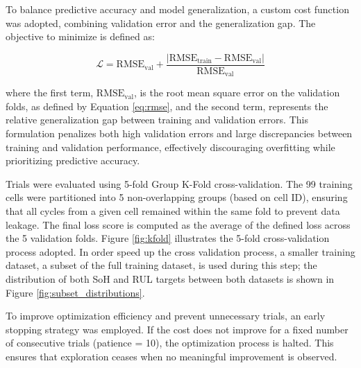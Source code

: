 To balance predictive accuracy and model generalization, a custom cost function was adopted, combining validation error and the generalization gap. The objective to minimize is defined as:

\begin{equation}
    \mathcal{L} = \mathrm{RMSE}_{\text{val}} + \frac{\left| \mathrm{RMSE}_{\text{train}} - \mathrm{RMSE}_{\text{val}} \right|}{\mathrm{RMSE}_{\text{val}}}
\end{equation}

where the first term, \(\text{RMSE}_{\text{val}}\), is the root mean square error on the validation folds, as defined by Equation \ref{eq:rmse}, and the second term, %
represents the relative generalization gap between training and validation errors. This formulation penalizes both high validation errors and large discrepancies between training and validation performance, effectively discouraging overfitting while prioritizing predictive accuracy.

Trials were evaluated using 5-fold Group K-Fold cross-validation. The 99 training cells were partitioned into 5 non-overlapping groups (based on cell ID), ensuring that all cycles from a given cell remained within the same fold to prevent data leakage. The final loss score is computed as the average of the defined loss across the 5 validation folds. Figure \ref{fig:kfold} illustrates the 5-fold cross-validation process adopted. In order speed up the cross validation process, a smaller training dataset, a subset of the full training dataset, is used during this step; the distribution of both SoH and RUL targets between both datasets is shown in Figure \ref{fig:subset_distributions}.

To improve optimization efficiency and prevent unnecessary trials, an early stopping strategy was employed. If the cost does not improve for a fixed number of consecutive trials (patience = 10), the optimization process is halted. This ensures that exploration ceases when no meaningful improvement is observed.

